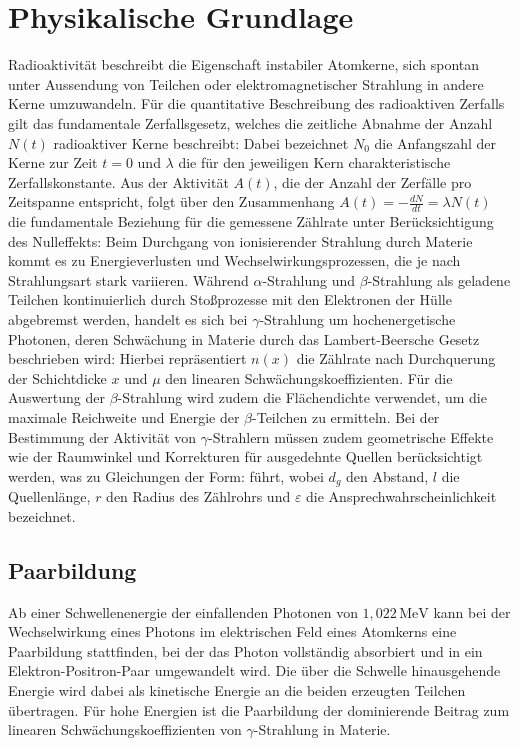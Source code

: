 \section{Physikalische Grundlage}
\label{sec:PhyBasics}
Radioaktivität beschreibt die Eigenschaft instabiler Atomkerne, sich spontan unter Aussendung von Teilchen oder elektromagnetischer Strahlung in andere Kerne umzuwandeln. Für die quantitative Beschreibung des radioaktiven Zerfalls gilt das fundamentale Zerfallsgesetz, welches die zeitliche Abnahme der Anzahl $N(t)$ radioaktiver Kerne beschreibt:
Dabei bezeichnet $N_0$ die Anfangszahl der Kerne zur Zeit $t = 0$ und $\lambda$ die für den jeweiligen Kern charakteristische Zerfallskonstante. Aus der Aktivität $A(t)$, die der Anzahl der Zerfälle pro Zeitspanne entspricht, folgt über den Zusammenhang $A(t) = -\frac{dN}{dt} = \lambda N(t)$ die fundamentale Beziehung für die gemessene Zählrate unter Berücksichtigung des Nulleffekts:
Beim Durchgang von ionisierender Strahlung durch Materie kommt es zu Energieverlusten und Wechselwirkungsprozessen, die je nach Strahlungsart stark variieren. Während $\alpha$-Strahlung und $\beta$-Strahlung als geladene Teilchen kontinuierlich durch Stoßprozesse mit den Elektronen der Hülle abgebremst werden, handelt es sich bei $\gamma$-Strahlung um hochenergetische Photonen, deren Schwächung in Materie durch das Lambert-Beersche Gesetz beschrieben wird:
Hierbei repräsentiert $n(x)$ die Zählrate nach Durchquerung der Schichtdicke $x$ und $\mu$ den linearen Schwächungskoeffizienten. Für die Auswertung der $\beta$-Strahlung wird zudem die Flächendichte verwendet, um die maximale Reichweite und Energie der $\beta$-Teilchen zu ermitteln. Bei der Bestimmung der Aktivität von $\gamma$-Strahlern müssen zudem geometrische Effekte wie der Raumwinkel und Korrekturen für ausgedehnte Quellen berücksichtigt werden, was zu Gleichungen der Form:
führt, wobei $d_g$ den Abstand, $l$ die Quellenlänge, $r$ den Radius des Zählrohrs und $\varepsilon$ die Ansprechwahrscheinlichkeit bezeichnet.

\subsection{Paarbildung}
Ab einer Schwellenenergie der einfallenden Photonen von $1,022\,\text{MeV}$ kann bei der Wechselwirkung eines Photons im elektrischen Feld eines Atomkerns eine Paarbildung stattfinden, bei der das Photon vollständig absorbiert und in ein Elektron-Positron-Paar umgewandelt wird. Die über die Schwelle hinausgehende Energie wird dabei als kinetische Energie an die beiden erzeugten Teilchen übertragen. Für hohe Energien ist die Paarbildung der dominierende Beitrag zum linearen Schwächungskoeffizienten von $\gamma$-Strahlung in Materie.

